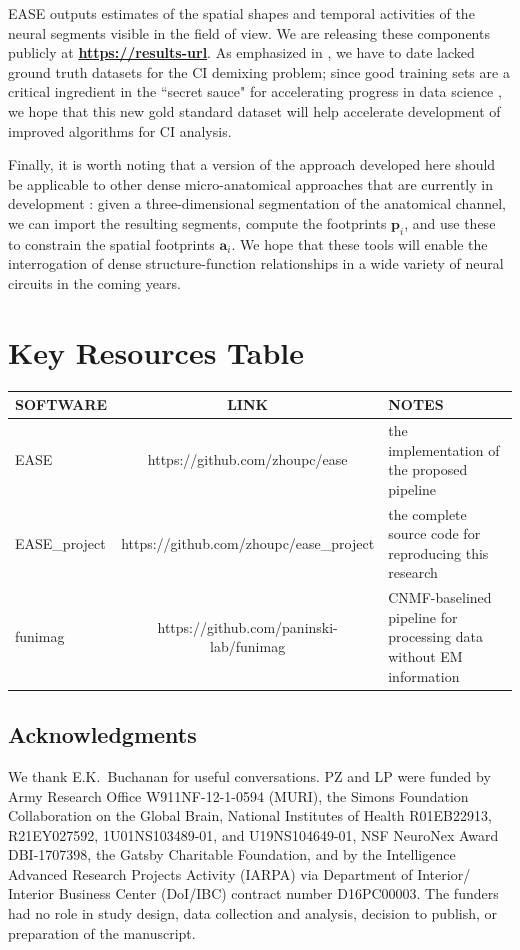 \documentclass[10pt,letterpaper]{article}
\def \resultURL{https://results-url}
\begin{document}
{EASE outputs estimates of the spatial shapes and temporal activities of the neural segments visible in the field of view.  We are releasing these components publicly at \href{\resultURL}{\bf\resultURL}.  
As emphasized in \citep{Paninski2018, Soltanian2019}, we have to date lacked ground truth datasets for the CI demixing problem; since good training sets are a critical ingredient in the ``secret sauce" for accelerating progress in data science \citep{Donoho2017}, we hope that this new gold standard dataset will help accelerate development of improved algorithms for CI analysis.

Finally, it is worth noting that a version of the approach developed here should be applicable to other dense micro-anatomical approaches that are currently in development \citep{Alon2018, Gao2019}: given a three-dimensional segmentation of the anatomical channel, we can import the resulting segments, compute the footprints $\bm{p}_i$, and use these to constrain the spatial footprints $\bm{a}_i$.  We hope that these tools will enable the interrogation of dense structure-function relationships in a wide variety of neural circuits in the coming years.


\section*{Key Resources Table}


\begin{tabu} to 1
 \hline
 \textbf{SOFTWARE} & \textbf{LINK} & \textbf{NOTES} \\
 \hline
 EASE &https://github.com/zhoupc/ease& the implementation of the proposed pipeline \\
 \hline
 EASE\_project &https://github.com/zhoupc/ease\_project & the complete source code for reproducing this research \\
 \hline
 funimag  & https://github.com/paninski-lab/funimag  & CNMF-baselined pipeline for processing data without EM information  \\
\hline
\end{tabu}


\subsection*{Acknowledgments}

We thank E.K.\ Buchanan for useful conversations.
PZ and LP were funded by Army Research Office W911NF-12-1-0594 (MURI), the Simons Foundation Collaboration on the Global Brain, National Institutes of Health R01EB22913, R21EY027592, 1U01NS103489-01, and U19NS104649-01, NSF NeuroNex Award DBI-1707398, the Gatsby Charitable Foundation, and by the Intelligence Advanced Research Projects Activity (IARPA) via Department of Interior/ Interior Business Center (DoI/IBC) contract number D16PC00003. The funders had no role in study design, data collection and analysis, decision to publish, or preparation of the manuscript.

}
\end{document}
